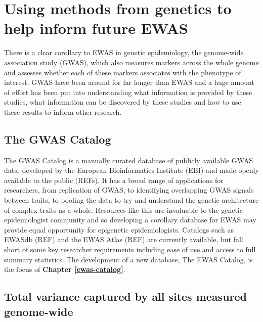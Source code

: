 \documentclass[11pt,twoside]{bristolthesis}
\begin{document}
\hypertarget{genetics-in-ewas}{%
\section{Using methods from genetics to help inform future EWAS}\label{genetics-in-ewas}}

There is a clear corollary to EWAS in genetic epidemiology, the genome-wide association study (GWAS), which also measures markers across the whole genome and assesses whether each of these markers associates with the phenotype of interest. GWAS have been around for far longer than EWAS and a huge amount of effort has been put into understanding what information is provided by these studies, what information can be discovered by these studies and how to use these results to inform other research.

\hypertarget{gwas-catalog}{%
\subsection{The GWAS Catalog}\label{gwas-catalog}}

The GWAS Catalog is a manually curated database of publicly available GWAS data, developed by the European Bioinformatics Institute (EBI) and made openly available to the public (REFs). It has a broad range of applications for researchers, from replication of GWAS, to identifying overlapping GWAS signals between traits, to pooling the data to try and understand the genetic architecture of complex traits as a whole. Resources like this are invaluable to the genetic epidemiologist community and so developing a corollary database for EWAS may provide equal opportunity for epigenetic epidemiologists. Catalogs such as EWASdb (REF) and the EWAS Atlas (REF) are currently available, but fall short of some key researcher requirements including ease of use and access to full summary statistics. The development of a new database, The EWAS Catalog, is the focus of \textbf{Chapter \ref{ewas-catalog}}.

\hypertarget{heritability}{%
\subsection{Total variance captured by all sites measured genome-wide}\label{heritability}}
\end{document}
